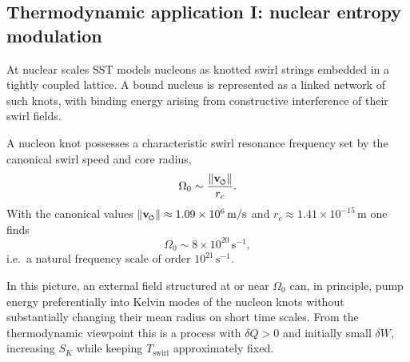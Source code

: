 \documentclass[11pt]{article}
\newcommand{\vnorm}{\lVert \mathbf{v}_{\mkern-2mu\scriptscriptstyle\boldsymbol{\circlearrowleft}} \rVert} %
\newcommand{\rc}{r_c}                                    %
\begin{document}
        \subsection{Thermodynamic application I: nuclear entropy modulation}
            \label{subsec:nuclear-entropy-modulation}

            At nuclear scales SST models nucleons as knotted swirl strings
            embedded in a tightly coupled lattice.
            A bound nucleus is represented as a linked network of such knots, with
            binding energy arising from constructive interference of their swirl
            fields.

            A nucleon knot possesses a characteristic swirl resonance frequency
            set by the canonical swirl speed and core radius,
            \begin{equation}
                \Omega_0 \sim \frac{\vnorm}{\rc}.
            \end{equation}
            With the canonical values
            $\vnorm \approx 1.09\times 10^6\,\mathrm{m/s}$ and
            $\rc \approx 1.41\times 10^{-15}\,\mathrm{m}$ one finds
            \begin{equation}
                \Omega_0 \sim 8\times 10^{20}\,\mathrm{s^{-1}},
            \end{equation}
            i.e.\ a natural frequency scale of order $10^{21}\,\mathrm{s^{-1}}$.

            In this picture, an external field structured at or near $\Omega_0$
            can, in principle, pump energy preferentially into Kelvin modes of the
            nucleon knots without substantially changing their mean radius on
            short time scales.
            From the thermodynamic viewpoint this is a process with
            $\delta Q>0$ and initially small $\delta W$, increasing $S_K$ while
            keeping $T_{\text{swirl}}$ approximately fixed.
\end{document}
